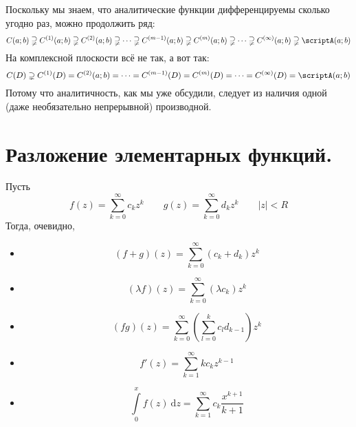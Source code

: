 \documentclass{article}
\begin{document}
    \begin{remark}
        Поскольку мы знаем, что аналитические функции дифференцируемы сколько угодно раз, можно продолжить ряд:
        $$
        C(a;b)\supsetneqq C^{(1)}(a;b)\supsetneqq C^{(2)}(a;b)\supsetneqq\cdots\supsetneqq C^{(m-1)}(a;b)\supsetneqq C^{(m)}(a;b)\supsetneqq\cdots\supsetneqq C^{(\infty)}(a;b)\supsetneqq\scriptA(a;b)
        $$
        На комплексной плоскости всё не так, а вот так:
        $$
        C(D)\supsetneq C^{(1)}(D)=C^{(2)}(a;b)=\cdots=C^{(m-1)}(D)=C^{(m)}(D)=\cdots=C^{(\infty)}(D)=\scriptA(a;b)
        $$
        Потому что аналитичность, как мы уже обсудили, следует из наличия одной (даже необязательно непрерывной) производной.
    \end{remark}
    \section{Разложение элементарных функций.}
    Пусть
    $$
    f(z)=\sum\limits_{k=0}^\infty c_kz^k\qquad g(z)=\sum\limits_{k=0}^\infty d_kz^k\qquad|z|<R
    $$
    Тогда, очевидно,
    \begin{itemize}
        \item $$
        (f+g)(z)=\sum\limits_{k=0}^\infty(c_k+d_k)z^k
        $$
        \item $$
        (\lambda f)(z)=\sum\limits_{k=0}^\infty(\lambda c_k)z^k
        $$
        \item $$
        (fg)(z)=\sum\limits_{k=0}^\infty\left(\sum\limits_{l=0}^kc_ld_{k-1}\right)z^k
        $$
        \item $$
        f'(z)=\sum\limits_{k=1}^\infty kc_kz^{k-1}
        $$
        \item $$
        \int\limits_0^x f(z)~\mathrm dz=\sum\limits_{k=1}^\infty c_k\frac{x^{k+1}}{k+1}
        $$
    \end{itemize}
\end{document}
